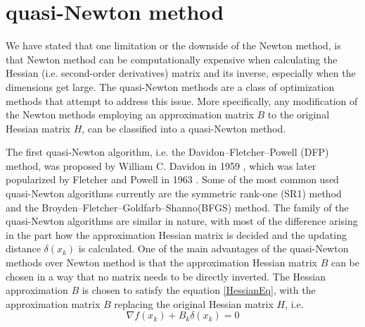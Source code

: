 \documentclass  [
  paper    = a4,
  BCOR     = 10mm,
  twoside,
  fontsize = 12pt,
  fleqn,
  toc      = bibnumbered,
  toc      = listofnumbered,
  numbers  = noendperiod,
  headings = normal,
  listof   = leveldown,
  version  = 3.03
]                                       {scrreprt}
\newcommand{\<}{\langle}
\renewcommand{\>}{\rangle}
\begin{document}
   \section{quasi-Newton method}
   We have stated that one limitation or the downside of the Newton method, is that Newton method can be computationally expensive when calculating the Hessian (i.e. second-order derivatives)  matrix and its inverse, especially when the dimensions get large. The quasi-Newton methods are a class of optimization methods that attempt to address this issue. More specifically, any modification of the Newton methods employing an approximation matrix $B$ to the original Hessian matrix $H$, can be classified into a quasi-Newton method. 
   
   The first quasi-Newton algorithm, i.e. the Davidon–Fletcher–Powell (DFP) method, was proposed by William C. Davidon in 1959 \cite{WilDav59}, which was later popularized by Fletcher and Powell in 1963 \cite{FlePow63}. Some of the most common used quasi-Newton algorithms currently are the symmetric rank-one (SR1) method \cite{ANP91} and the Broyden–Fletcher–Goldfarb–Shanno(BFGS) method. The family of the quasi-Newton algorithms are similar in nature, with most of the difference arising in the part how the approximation Hessian matrix is decided and the updating distance $\delta(x_k) $ is calculated. One of the main advantages of the quasi-Newton methods over Newton method is that the approximation Hessian matrix $B$ can be chosen in a way that no matrix needs to be directly inverted. The Hessian approximation $B$ is chosen to satisfy the equation \ref{HessianEq}, with the approximation matrix $B$ replacing the original Hessian matrix $H$, i.e. 
   \begin{equation}
   \nabla f(x_k) +B_k\delta(x_k) =0
   \label{HessianAppro}
   \end{equation}
   
\end{document}
